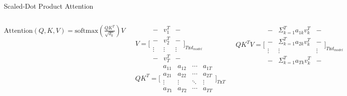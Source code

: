 \documentclass{beamer}
\begin{document}
\begin{frame}{Scaled-Dot Product Attention}
\begin{columns}


        $
        \text{Attention}(Q, K, V) = \text{softmax}\left(\frac{QK^T}{\sqrt{d_k}}\right)V
        $




\begin{columns}

$
V = \Bigg[
\begin{array}{ccc}
- & v_{1}^T & - \\
- & v_{2}^T & -  \\
\vdots & \vdots & \vdots \\
- & v_{T}^T & -
\end{array}
\Bigg]_{T \texttt{x} d_{model}}
$
$
QK^T = \Bigg[
\begin{array}{cccc}
a_{11} & a_{12} & \cdots & a_{1T} \\
a_{21} & a_{22} & \cdots & a_{2T} \\
\vdots & \vdots & \ddots & \vdots \\
a_{T1} & a_{T2} & \cdots & a_{TT}
\end{array}
\Bigg]_{T\texttt{x}T}
$

\end{columns}


$
QK^TV = \Bigg[
\begin{array}{ccc}
- & \Sigma_{k=1}^Ta_{1k}v_{k}^T & - \\
- & \Sigma_{k=1}^Ta_{2k}v_{k}^T & -  \\
\vdots & \vdots & \vdots \\
- & \Sigma_{k=1}^Ta_{Tk}v_{k}^T & -
\end{array}
\Bigg]_{T \texttt{x} d_{model}}
$




\end{columns}

    
\end{frame}
\end{document}
